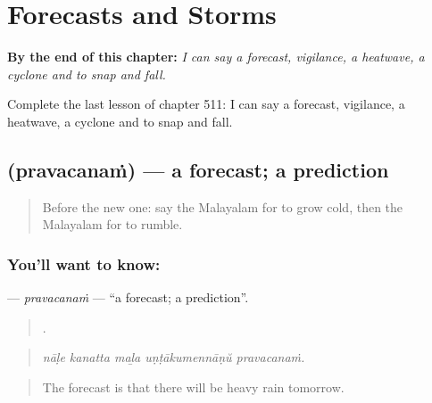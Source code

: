 
\chapter{Forecasts and Storms}
\label{ch:ml-forecasts-and-storms}

\begin{chapteropening}
\textbf{By the end of this chapter:} \emph{I can say a forecast, vigilance, a heatwave, a cyclone and to snap and fall.}

Complete the last lesson of chapter 511: I can say a forecast, vigilance, a heatwave, a cyclone and to snap and fall.
\end{chapteropening}

\section[\texorpdfstring{\ml{പ്രവചനം} (pravacanaṁ)}{പ്രവചനം (pravacanaṁ)}]{ (pravacanaṁ) — a forecast; a prediction}

\label{lesson:ML-C511-pravacanam}



\begin{quote}
Before the new one: say the Malayalam for to grow cold, then the Malayalam for to rumble.
\end{quote}

\subsection*{You'll want to know: }
\textbf{} — \emph{pravacanaṁ} — \textquotedblleft{}a forecast; a prediction\textquotedblright{}.

\begin{quote}
    .
\end{quote}

\begin{quote}
\emph{nāḷe kanatta maḻa uṇṭākumennāṇŭ pravacanaṁ.}
\end{quote}

\begin{quote}
The forecast is that there will be heavy rain tomorrow.
\end{quote}

